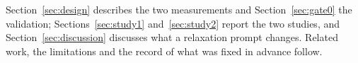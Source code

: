 Section~\ref{sec:design} describes the two measurements and Section~\ref{sec:gate0} the validation;
Sections~\ref{sec:study1} and~\ref{sec:study2} report the two studies, and
Section~\ref{sec:discussion} discusses what a relaxation prompt changes.
Related work, the limitations and the record of what was fixed in advance follow.
